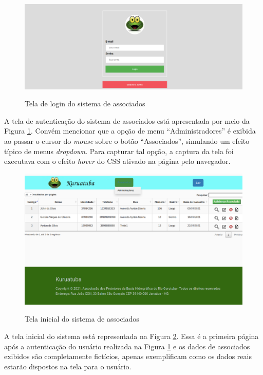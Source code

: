 \begin{figure}[htb]
 \centering
 \caption{Tela de login do sistema de associados}
 \includegraphics[width=1\textwidth]{figuras/kuruatuba_sistema_login.png}
 \label{fig:login-sistema}
\end{figure}

A tela de autenticação do sistema de associados está apresentada por meio da Figura \ref{fig:login-sistema}. Convém mencionar que a opção de menu ``Administradores'' é exibida ao passar o cursor do \textit{mouse} sobre o botão ``Associados'', simulando um efeito típico de menus \textit{dropdown}. Para capturar tal opção, a captura da tela foi executava com o efeito \textit{hover} do CSS ativado na página pelo navegador.  

\begin{figure}[htb]
 \centering
 \caption{Tela inicial do sistema de associados}
 \includegraphics[width=1\textwidth]{figuras/kuruatuba_sistema_home.png}
 \label{fig:home-sistema}
\end{figure}

A tela inicial do sistema está representada na Figura \ref{fig:home-sistema}. Essa é a primeira página após a autenticação do usuário realizada na Figura \ref{fig:login-sistema} e os dados de associados exibidos são completamente fictícios, apenas exemplificam como  os dados reais estarão dispostos na tela para o usuário.

